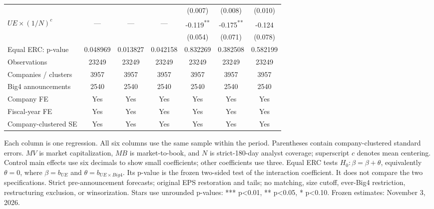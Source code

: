 \documentclass[10pt]{article}
\newcommand{\sym}[1]{\textsuperscript{#1}}
\begin{document}
\begin{tabular*}{\textwidth}{@{\extracolsep{\fill}}lcccccc@{}}
 &  &  &  & (0.007) & (0.008) & (0.010) \\
\(UE\times(1/N)^c\) & --- & --- & --- & -0.119\sym{**} & -0.175\sym{**} & -0.124\sym{} \\
 &  &  &  & (0.054) & (0.071) & (0.078) \\
\midrule
Equal ERC: p-value & 0.048969 & 0.013827 & 0.042158 & 0.832269 & 0.382508 & 0.582199 \\
Observations & 23249 & 23249 & 23249 & 23249 & 23249 & 23249 \\
Companies / clusters & 3957 & 3957 & 3957 & 3957 & 3957 & 3957 \\
Big4 announcements & 2540 & 2540 & 2540 & 2540 & 2540 & 2540 \\
Company FE & Yes & Yes & Yes & Yes & Yes & Yes \\
Fiscal-year FE & Yes & Yes & Yes & Yes & Yes & Yes \\
Company-clustered SE & Yes & Yes & Yes & Yes & Yes & Yes \\
\bottomrule\end{tabular*}\par\medskip
\noindent\footnotesize Each column is one regression. All six columns use the same sample within the period. Parentheses contain company-clustered standard errors. \(MV\) is market capitalization, \(MB\) is market-to-book, and \(N\) is strict-180-day analyst coverage; superscript \(c\) denotes mean centering. Control main effects use six decimals to show small coefficients; other coefficients use three. Equal ERC tests \(H_0:\beta=\beta+\theta\), equivalently \(\theta=0\), where \(\beta=b_{UE}\) and \(\theta=b_{UE\times Big4}\). Its p-value is the frozen two-sided test of the interaction coefficient. It does not compare the two specifications. Strict pre-announcement forecasts; original EPS restoration and tails; no matching, size cutoff, ever-Big4 restriction, restructuring exclusion, or winsorization. Stars use unrounded p-values: *** p<0.01, ** p<0.05, * p<0.10. Frozen estimates: November 3, 2026.
\end{document}
